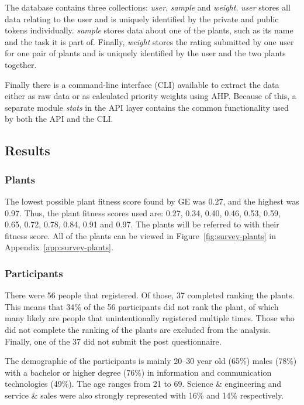 The database contains three collections: \textit{user}, \textit{sample} and \textit{weight}.
\textit{user} stores all data relating to the user and is uniquely identified by the private and public tokens individually.
\textit{sample} stores data about one of the plants, such as its name and the task it is part of.
Finally, \textit{weight} stores the rating submitted by one user for one pair of plants and is uniquely identified by the user and the two plants together.

Finally there is a command-line interface (CLI) available to extract the data either as raw data or as calculated priority weights using \gls{AHP}.
Because of this, a separate module \textit{stats} in the API layer contains the common functionality used by both the API and the CLI.

\subsection{Results}
\subsubsection{Plants}
The lowest possible plant fitness score found by \gls{GE} was 0.27, and the highest was 0.97.
Thus, the plant fitness scores used are: 0.27, 0.34, 0.40, 0.46, 0.53, 0.59, 0.65, 0.72, 0.78, 0.84, 0.91 and 0.97.
The plants will be referred to with their fitness score.
All of the plants can be viewed in Figure~\ref{fig:survey-plants} in Appendix~\ref{app:survey-plants}.

\subsubsection{Participants}

There were 56 people that registered.
Of those, 37 completed ranking the plants.
This means that 34\% of the 56 participants did not rank the plant, of which many likely are people that unintentionally registered multiple times.
Those who did not complete the ranking of the plants are excluded from the analysis.
Finally, one of the 37 did not submit the post questionnaire.

The demographic of the participants is mainly 20--30 year old (65\%) males (78\%) with a bachelor or higher degree (76\%) in information and communication technologies (49\%).
The age ranges from 21 to 69.
Science \& engineering and service \& sales were also strongly represented with 16\% and 14\% respectively.

